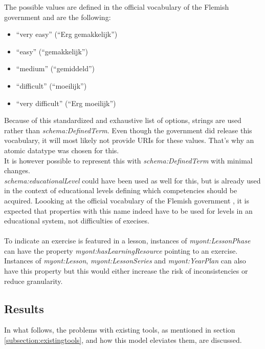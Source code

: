 \documentclass[a4paper]{report}
\begin{document}
    The possible values are defined in the official vocabulary of the Flemish government \cite{pubelovoc} and are the following:
    \begin{itemize}
        \item ``very easy'' (``Erg gemakkelijk'')
        \item ``easy'' (``gemakkelijk'')
        \item ``medium'' (``gemiddeld'')
        \item ``difficult'' (``moeilijk'')
        \item ``very difficult'' (``Erg moeilijk'')
    \end{itemize}
    Because of this standardized and exhaustive list of options, strings are used rather than \textit{schema:DefinedTerm}.
    Even though the government did release this vocabulary, it will most likely not provide URIs for these values. That's why an atomic datatype was chosen for this.\\
    It is however possible to represent this with \textit{schema:DefinedTerm} with minimal changes.\\
    \textit{schema:educationalLevel} could have been used as well for this, but is already used in the context of educational levels defining which competencies should be acquired.
    Loooking at the official vocabulary of the Flemish government \cite{pubelovoc}, it is expected that properties with this name indeed have to be used for levels in an educational system, not difficulties of execises.\\ \\
    To indicate an exercise is featured in a lesson, instances of \textit{myont:LessonPhase} can have the property \textit{myont:hasLearningResource} pointing to an exercise.
    Instances of \textit{myont:Lesson}, \textit{myont:LessonSeries} and \textit{myont:YearPlan} can also have this property but this would either increase the risk of inconsistencies or reduce granularity.

    \subsection{Results}
    \label{subsection:results}
    In what follows, the problems with existing tools, as mentioned in section \ref{subsection:existingtools}, and how this model eleviates them, are discussed.
\end{document}

